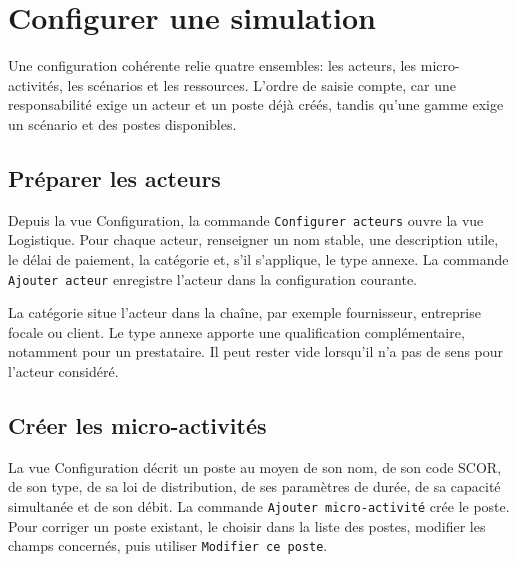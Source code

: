 \chapter{Configurer une simulation}
\label{chap:configurer}

Une configuration cohérente relie quatre ensembles: les acteurs, les micro-activités, les scénarios et les ressources. L'ordre de saisie compte, car une responsabilité exige un acteur et un poste déjà créés, tandis qu'une gamme exige un scénario et des postes disponibles.



\section{Préparer les acteurs}

Depuis la vue Configuration, la commande \texttt{Configurer acteurs} ouvre la vue Logistique. Pour chaque acteur, renseigner un nom stable, une description utile, le délai de paiement, la catégorie et, s'il s'applique, le type annexe. La commande \texttt{Ajouter acteur} enregistre l'acteur dans la configuration courante.

La catégorie situe l'acteur dans la chaîne, par exemple fournisseur, entreprise focale ou client. Le type annexe apporte une qualification complémentaire, notamment pour un prestataire. Il peut rester vide lorsqu'il n'a pas de sens pour l'acteur considéré.



\section{Créer les micro-activités}

La vue Configuration décrit un poste au moyen de son nom, de son code SCOR, de son type, de sa loi de distribution, de ses paramètres de durée, de sa capacité simultanée et de son débit. La commande \texttt{Ajouter micro-activité} crée le poste. Pour corriger un poste existant, le choisir dans la liste des postes, modifier les champs concernés, puis utiliser \texttt{Modifier ce poste}.

